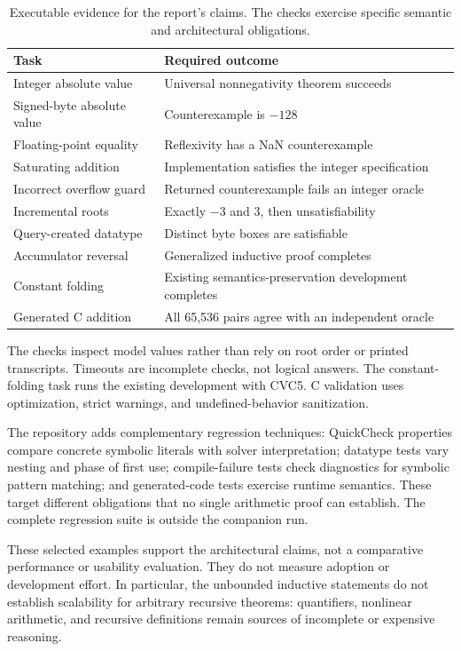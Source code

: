 \documentclass[acmsmall,screen,nonacm]{acmart}
\begin{document}
\begin{table}[t]
\caption{Executable evidence for the report's claims. The checks exercise
specific semantic and architectural obligations.}
\label{tab:checks}
\begin{tabularx}{\linewidth}{@{}l X@{}}
\toprule
Task & Required outcome\\
\midrule
Integer absolute value & Universal nonnegativity theorem succeeds\\
Signed-byte absolute value & Counterexample is $-128$\\
Floating-point equality & Reflexivity has a NaN counterexample\\
Saturating addition & Implementation satisfies the integer specification\\
Incorrect overflow guard & Returned counterexample fails an integer oracle\\
Incremental roots & Exactly $-3$ and $3$, then unsatisfiability\\
Query-created datatype & Distinct byte boxes are satisfiable\\
Accumulator reversal & Generalized inductive proof completes\\
Constant folding & Existing semantics-preservation development completes\\
Generated C addition & All 65,536 pairs agree with an independent oracle\\
\bottomrule
\end{tabularx}
\end{table}

The checks inspect model values rather than rely on root order or printed
transcripts. Timeouts are incomplete checks, not logical answers. The
constant-folding task runs the existing development with CVC5. C validation
uses optimization, strict warnings, and undefined-behavior sanitization.

The repository adds complementary regression techniques: QuickCheck properties
compare concrete symbolic literals with solver interpretation; datatype tests
vary nesting and phase of first use; compile-failure tests check diagnostics
for symbolic pattern matching; and generated-code tests exercise runtime
semantics. These target different obligations that no single arithmetic
proof can establish. The complete regression suite is outside the companion run.

These selected examples support the architectural claims, not a comparative
performance or usability evaluation. They do not measure adoption or development
effort. In particular, the unbounded inductive statements do not establish
scalability for arbitrary recursive theorems: quantifiers, nonlinear arithmetic,
and recursive definitions remain sources of incomplete or expensive reasoning.
\end{document}
